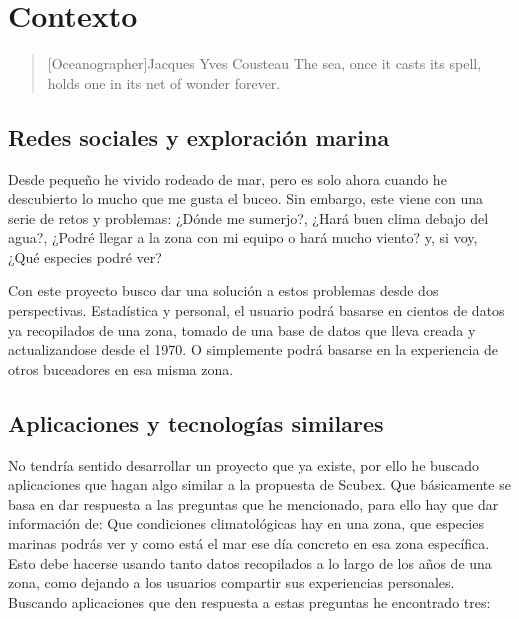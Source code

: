 \chapter{Contexto}

\begin{quotation}[Oceanographer]{Jacques Yves Cousteau}
The sea, once it casts its spell, holds one in its net of wonder forever.
\end{quotation}

\begin{abstract}
Vamos a dar una visión general del contexto en el que se desarrolla el proyecto, incluyendo el estado actual de la industria y el porqué del mismo.
\end{abstract}

\section{Redes sociales y exploración marina}

Desde pequeño he vivido rodeado de mar, pero es solo ahora cuando he descubierto lo mucho que me gusta el buceo. Sin embargo, este viene con una serie de retos y problemas: ¿Dónde me sumerjo?, ¿Hará buen clima debajo del agua?, ¿Podré llegar a la zona con mi equipo o hará mucho viento? y, si voy, ¿Qué especies podré ver?

Con este proyecto busco dar una solución a estos problemas desde dos perspectivas. Estadística y personal, el usuario podrá basarse en cientos de datos ya recopilados de una zona, tomado de una base de datos que lleva creada y actualizandose desde el 1970. O simplemente podrá basarse en la experiencia de otros buceadores en esa misma zona.
\section{Aplicaciones y tecnologías similares}

No tendría sentido desarrollar un proyecto que ya existe, por ello he buscado aplicaciones que hagan algo similar a la propuesta de Scubex. Que básicamente se basa en dar respuesta a las preguntas que he mencionado, para ello hay que dar información de: Que condiciones climatológicas hay en una zona, que especies marinas podrás ver y como está el mar ese día concreto en esa zona específica. Esto debe hacerse usando tanto datos recopilados a lo largo de los años de una zona, como dejando a los usuarios
compartir sus experiencias personales. Buscando aplicaciones que den respuesta a estas preguntas he encontrado tres: 

